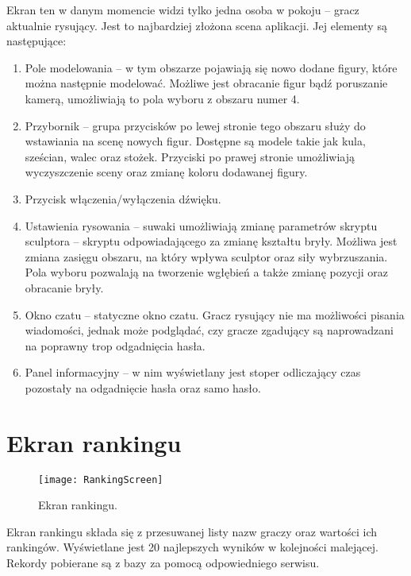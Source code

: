 Ekran ten w danym momencie widzi tylko jedna osoba w pokoju – gracz aktualnie rysujący. Jest to najbardziej złożona scena aplikacji. Jej elementy są następujące:
\begin{enumerate}
    \item Pole modelowania – w tym obszarze pojawiają się nowo dodane figury, które można następnie modelować. Możliwe jest obracanie figur bądź poruszanie kamerą, umożliwiają to pola wyboru z obszaru numer 4.
    \item Przybornik – grupa przycisków po lewej stronie tego obszaru służy do wstawiania na scenę nowych figur. Dostępne są modele takie jak kula, sześcian, walec oraz stożek. Przyciski po prawej stronie umożliwiają wyczyszczenie sceny oraz zmianę koloru dodawanej figury.
    \item Przycisk włączenia/wyłączenia dźwięku.
    \item Ustawienia rysowania – suwaki umożliwiają zmianę parametrów skryptu sculptora – skryptu odpowiadającego za zmianę kształtu bryły. Możliwa jest zmiana zasięgu obszaru, na który wpływa sculptor oraz siły wybrzuszania. Pola wyboru pozwalają na tworzenie wgłębień a także zmianę pozycji oraz obracanie bryły.
    \item Okno czatu – statyczne okno czatu. Gracz rysujący nie ma możliwości pisania wiadomości, jednak może podglądać, czy gracze zgadujący są naprowadzani na poprawny trop odgadnięcia hasła.
    \item Panel informacyjny – w nim wyświetlany jest stoper odliczający czas pozostały na odgadnięcie hasła oraz samo hasło.
\end{enumerate}

\section{Ekran rankingu}
\begin{figure}[htbp]
\centering
\texttt{[image: RankingScreen]}
\caption{Ekran rankingu.}
\label{fig:rankingscreen}
\end{figure}

Ekran rankingu składa się z przesuwanej listy nazw graczy oraz wartości ich rankingów. Wyświetlane jest 20 najlepszych wyników w kolejności malejącej. Rekordy pobierane są z bazy za pomocą odpowiedniego serwisu.	